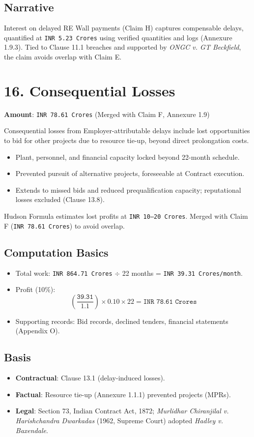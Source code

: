 \documentclass[12pt,letterpaper]{article}
\begin{document}
	\subsection*{Narrative}
	Interest on delayed RE Wall payments (Claim H) captures compensable delays, quantified at \texttt{INR 5.23 Crores} using verified quantities and logs (Annexure 1.9.3). Tied to Clause 11.1 breaches and supported by \textit{ONGC v. GT Beckfield}, the claim avoids overlap with Claim E.
	
	\section*{16. Consequential Losses}
	\textbf{Amount}: \texttt{INR 78.61 Crores} (Merged with Claim F, Annexure 1.9)
	
	Consequential losses from Employer-attributable delays include lost opportunities to bid for other projects due to resource tie-up, beyond direct prolongation costs.
	
	\begin{itemize}
		\item Plant, personnel, and financial capacity locked beyond 22-month schedule.
		\item Prevented pursuit of alternative projects, foreseeable at Contract execution.
		\item Extends to missed bids and reduced prequalification capacity; reputational losses excluded (Clause 13.8).
	\end{itemize}
	Hudson Formula estimates lost profits at \texttt{INR 10--20 Crores}. Merged with Claim F (\texttt{INR 78.61 Crores}) to avoid overlap.
	
	\subsection*{Computation Basics}
	\begin{itemize}
		\item Total work: \texttt{INR 864.71 Crores} $\div$ 22 months = \texttt{INR 39.31 Crores/month}.
		\item Profit (10\%):
		\[
		\left( \frac{\texttt{39.31}}{1.1} \right) \times 0.10 \times 22 = \texttt{INR 78.61 Crores}
		\]
		\item Supporting records: Bid records, declined tenders, financial statements (Appendix O).
	\end{itemize}
	
	\subsection*{Basis}
	\begin{itemize}
		\item \textbf{Contractual}: Clause 13.1 (delay-induced losses).
		\item \textbf{Factual}: Resource tie-up (Annexure 1.1.1) prevented projects (MPRs).
		\item \textbf{Legal}: Section 73, Indian Contract Act, 1872; \textit{Murlidhar Chiranjilal v. Harishchandra Dwarkadas} (1962, Supreme Court) adopted \textit{Hadley v. Baxendale}.
	\end{itemize}
	
\end{document}

